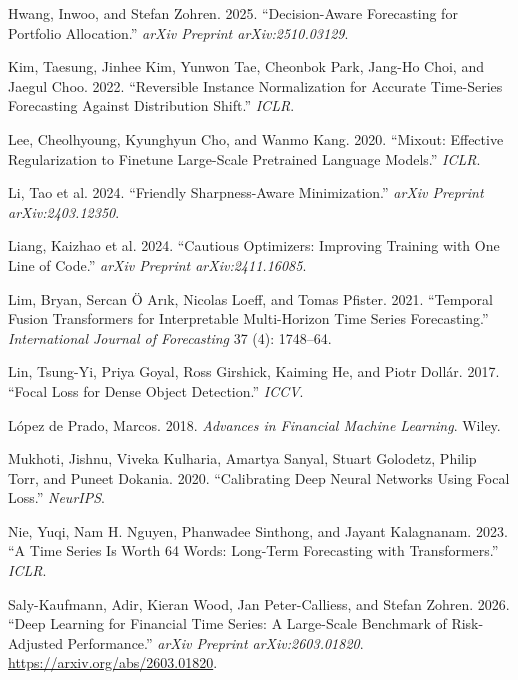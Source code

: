 \documentclass[
]{article}
\newlength{\cslhangindent}
\newenvironment{CSLReferences}[2] %
 {\begin{list}{}{%
  \setlength{\itemindent}{0pt}
  \setlength{\leftmargin}{0pt}
  \setlength{\parsep}{0pt}
  \ifodd #1
   \setlength{\leftmargin}{\cslhangindent}
   \setlength{\itemindent}{-1\cslhangindent}
  \fi
  \setlength{\itemsep}{#2\baselineskip}}}
 {\end{list}}
\begin{document}
\begin{CSLReferences}{1}{1}
Hwang, Inwoo, and Stefan Zohren. 2025. {``Decision-Aware Forecasting for
Portfolio Allocation.''} \emph{arXiv Preprint arXiv:2510.03129}.

Kim, Taesung, Jinhee Kim, Yunwon Tae, Cheonbok Park, Jang-Ho Choi, and
Jaegul Choo. 2022. {``Reversible Instance Normalization for Accurate
Time-Series Forecasting Against Distribution Shift.''} \emph{ICLR}.

Lee, Cheolhyoung, Kyunghyun Cho, and Wanmo Kang. 2020. {``Mixout:
Effective Regularization to Finetune Large-Scale Pretrained Language
Models.''} \emph{ICLR}.

{Li, Tao et al.} 2024. {``Friendly Sharpness-Aware Minimization.''}
\emph{arXiv Preprint arXiv:2403.12350}.

{Liang, Kaizhao et al.} 2024. {``Cautious Optimizers: Improving Training
with One Line of Code.''} \emph{arXiv Preprint arXiv:2411.16085}.

Lim, Bryan, Sercan Ö Arık, Nicolas Loeff, and Tomas Pfister. 2021.
{``Temporal Fusion Transformers for Interpretable Multi-Horizon Time
Series Forecasting.''} \emph{International Journal of Forecasting} 37
(4): 1748--64.

Lin, Tsung-Yi, Priya Goyal, Ross Girshick, Kaiming He, and Piotr Dollár.
2017. {``Focal Loss for Dense Object Detection.''} \emph{ICCV}.

López de Prado, Marcos. 2018. \emph{Advances in Financial Machine
Learning}. Wiley.

Mukhoti, Jishnu, Viveka Kulharia, Amartya Sanyal, Stuart Golodetz,
Philip Torr, and Puneet Dokania. 2020. {``Calibrating Deep Neural
Networks Using Focal Loss.''} \emph{NeurIPS}.

Nie, Yuqi, Nam H. Nguyen, Phanwadee Sinthong, and Jayant Kalagnanam.
2023. {``A Time Series Is Worth 64 Words: Long-Term Forecasting with
Transformers.''} \emph{ICLR}.

Saly-Kaufmann, Adir, Kieran Wood, Jan Peter-Calliess, and Stefan Zohren.
2026. {``Deep Learning for Financial Time Series: A Large-Scale
Benchmark of Risk-Adjusted Performance.''} \emph{arXiv Preprint
arXiv:2603.01820}. \url{https://arxiv.org/abs/2603.01820}.


\end{CSLReferences}
\end{document}
